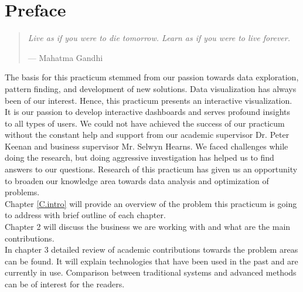 %
%
%
%

\chapter*{Preface}


\begin{quote}
\noindent\textit{Live as if you were to die tomorrow. Learn as if you were to live forever.}

\hspace{2cm}--- Mahatma Gandhi
\end{quote}

The basis for this practicum stemmed from our passion towards data exploration, pattern finding, and development of new solutions. Data visualization has always been of our interest. Hence, this practicum presents an interactive visualization. It is our passion to develop interactive dashboards and serves profound insights to all types of users. We could not have achieved the success of our practicum without the constant help and support from our academic supervisor Dr. Peter Keenan and business supervisor Mr. Selwyn Hearns. We faced challenges while doing the research, but doing aggressive investigation has helped us to find answers to our questions. Research of this practicum has given us an opportunity to broaden our knowledge area towards data analysis and optimization of problems.\\

Chapter \ref{C.intro} will provide an overview of the problem this practicum is going to address with brief outline of each chapter.\\

Chapter 2 will discuss the business we are working with and what are the main contributions.\\

In chapter 3 detailed review of academic contributions towards the problem areas can be found. It will explain technologies that have been used in the past and are currently in use. Comparison between traditional systems and advanced methods can be of interest for the readers.\\

